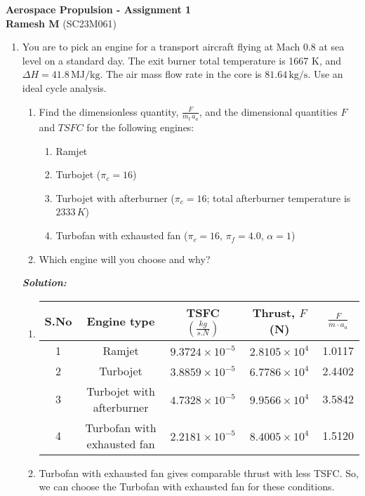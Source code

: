 \documentclass[]{article}
\theoremstyle{definition}
\begin{document}
\begin{center}
\vspace{.4cm}
{\bf{Aerospace Propulsion - Assignment 1}}
\vspace{.2cm}
\\
{\bf Ramesh M} (SC23M061)
\end{center}

\begin{enumerate}
\item You are to pick an engine for a transport aircraft flying at Mach 0.8 at sea level on a standard day. The exit burner total temperature is 1667 K, and \( \Delta H = 41.8 \, \text{MJ/kg} \). The air mass flow rate in the core is \( 81.64 \, \text{kg/s} \). Use an ideal cycle analysis.
\begin{enumerate}
\item Find the dimensionless quantity, \( \frac{F}{\dot{m_t}\,a_a}\), and the dimensional quantities \( F\) and \(TSFC\) for the following engines:
\begin{enumerate}
\item Ramjet
\item Turbojet (\( \pi_c = 16 \))
\item Turbojet with afterburner (\( \pi_c = 16 \); total afterburner temperature is \(2333\, K\))
\item Turbofan with exhausted fan (\( \pi_c = 16\), \( \pi_f = 4.0\), \( \alpha = 1\))
\end{enumerate}
\item Which engine will you choose and why?
\end{enumerate}
\emph{\textbf{Solution:}}
\begin{enumerate}
\item
\begin{tabular}{|c|c|c|c|c|}
\hline
S.No & Engine type & TSFC $(\frac{kg}{s.N})$ & Thrust, \( F \) (N) & \( \frac{F}{\dot{m} \cdot a_a} \) \\
\hline
1 & Ramjet & \( 9.3724 \times 10^{-5} \) & \( 2.8105 \times 10^{4} \) & 1.0117 \\
\hline
2 & Turbojet & \( 3.8859 \times 10^{-5} \) & \( 6.7786 \times 10^{4} \) & 2.4402 \\
\hline
3 & Turbojet with afterburner & \( 4.7328 \times 10^{-5} \) & \( 9.9566 \times 10^{4} \) & 3.5842 \\
\hline
4 & Turbofan with exhausted fan & \( 2.2181 \times 10^{-5} \) & \( 8.4005 \times 10^{4} \) & 1.5120 \\
\hline
\end{tabular}
\item
Turbofan with exhausted fan gives comparable thrust with less TSFC. So, we can choose the Turbofan with exhausted fan for these conditions.
\end{enumerate}


\end{enumerate}
\end{document}
